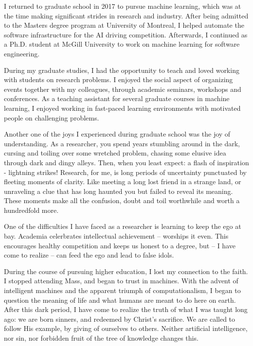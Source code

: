 \documentclass[11pt]{article}
\begin{document}
I returned to graduate school in 2017 to pursue machine learning, which was at the time making significant strides in research and industry. After being admitted to the Masters degree program at University of Montreal, I helped automate the software infrastructure for the AI driving competition. Afterwards, I continued as a Ph.D. student at McGill University to work on machine learning for software engineering.

During my graduate studies, I had the opportunity to teach and loved working with students on research problems. I enjoyed the social aspect of organizing events together with my colleagues, through academic seminars, workshops and conferences. As a teaching assistant for several graduate courses in machine learning, I enjoyed working in fast-paced learning environments with motivated people on challenging problems.

Another one of the joys I experienced during graduate school was the joy of understanding. As a researcher, you spend years stumbling around in the dark, cursing and toiling over some wretched problem, chasing some elusive idea through dark and dingy alleys. Then, when you least expect: a flash of inspiration - lightning strikes! Research, for me, is long periods of uncertainty punctuated by fleeting moments of clarity. Like meeting a long lost friend in a strange land, or unraveling a clue that has long haunted you but failed to reveal its meaning. These moments make all the confusion, doubt and toil worthwhile and worth a hundredfold more.

One of the difficulties I have faced as a researcher is learning to keep the ego at bay. Academia celerbrates intellectual achievement -- worships it even. This encourages healthy competition and keeps us honest to a degree, but -- I have come to realize -- can feed the ego and lead to false idols.

During the course of pursuing higher education, I lost my connection to the faith. I stopped attending Mass, and began to trust in machines. With the advent of intelligent machines and the apparent triumph of computationalism, I began to question the meaning of life and what humans are meant to do here on earth. After this dark period, I have come to realize the truth of what I was taught long ago: we are born sinners, and redeemed by Christ's sacrifice. We are called to follow His example, by giving of ourselves to others. Neither artificial intelligence, nor sin, nor forbidden fruit of the tree of knowledge changes this.
\end{document}
